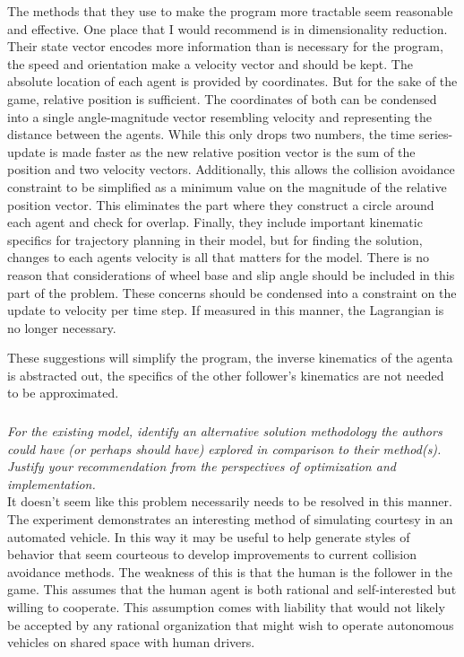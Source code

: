 \documentclass[12pt]{amsart}
\begin{document}
The methods that they use to make the program more tractable seem reasonable and effective.
One place that I would recommend is in dimensionality reduction.
Their state vector encodes more information than is necessary for the program,
the speed and orientation make a velocity vector and should be kept.
The absolute location of each agent is provided by coordinates. 
But for the sake of the game, relative position is sufficient.
The coordinates of both can be condensed into a single angle-magnitude vector resembling velocity
and representing the distance between the agents.
While this only drops two numbers, the time series-update is made faster as the new relative position vector is the 
sum of the position and two velocity vectors.
Additionally, this allows the collision avoidance constraint to be simplified 
as a minimum value on the magnitude of the relative position vector.
This eliminates the part where they construct a circle around each agent and check for overlap.
Finally, they include important kinematic specifics for trajectory planning in their model, but for finding the 
solution, changes to each agents velocity is all that matters for the model.
There is no reason that considerations of wheel base and slip angle should be included in this part of the problem.
These concerns should be condensed into a constraint on the update to velocity per time step.
If measured in this manner, the Lagrangian is no longer necessary.

These suggestions will simplify the program, the inverse kinematics of the agenta is abstracted out, 
the specifics of the other follower's kinematics are not needed to be approximated.

\subsubsection{}
\textit{For the existing model, identify an alternative solution methodology the authors could have (or perhaps should have) explored in comparison to their method(s). Justify your recommendation from the perspectives of optimization and implementation.} \\

It doesn't seem like this problem necessarily needs to be resolved in this manner.
The experiment demonstrates an interesting method of simulating courtesy in an automated vehicle.
In this way it may be useful to help generate styles of behavior that seem courteous to develop
improvements to current collision avoidance methods.
The weakness of this is that the human is the follower in the game. 
This assumes that the human agent is both rational and self-interested but willing to cooperate.
This assumption comes with liability that would not likely be accepted by any rational organization that 
might wish to operate autonomous vehicles on shared space with human drivers.
\end{document}
